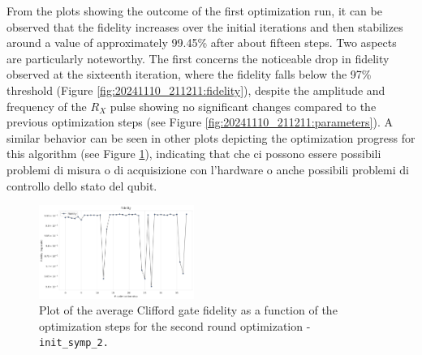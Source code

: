 From the plots showing the outcome of the first optimization run, it can be observed that the fidelity increases over the initial iterations and then stabilizes around a value of approximately 99.45\% after about fifteen steps.
Two aspects are particularly noteworthy. The first concerns the noticeable drop in fidelity observed at the sixteenth iteration, where the fidelity falls below the 97\% threshold (Figure \ref{fig:20241110_211211:fidelity}), despite the amplitude and frequency of the $R_X$ pulse showing no significant changes compared to the previous optimization steps (see Figure \ref{fig:20241110_211211:parameters}).
A similar behavior can be seen in other plots depicting the optimization progress for this algorithm (see Figure \ref{fig:20241113_181711:fidelity}), indicating that che ci possono essere possibili problemi di misura o di acquisizione con l'hardware o anche possibili problemi di controllo dello stato del qubit.

\begin{figure}[h!]
    \centering
    \includegraphics[width=0.45\textwidth]{figures/png/RB_optimization/NM/InitialSymplex/20241113_181711/fidelity.png}
    \caption{Plot of the average Clifford gate fidelity as a function of the optimization steps for the second round optimization - \tt{init\_symp\_2}.}
    \label{fig:20241113_181711:fidelity}
\end{figure}

